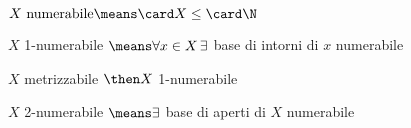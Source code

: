 \begin{defn}[Numerabilità]
$X\text{ numerabile}\means\card X\leq\card\N$
\end{defn}

\begin{defn}
$X$ 1-numerabile $\means\forall x\in X\,\exists$ base di intorni di $x$ numerabile
\end{defn}

\begin{prop}
$X$ metrizzabile $\then X$ 1-numerabile
\end{prop}

\begin{defn}
$X$ 2-numerabile $\means\exists$ base di aperti di $X$ numerabile
\end{defn}
